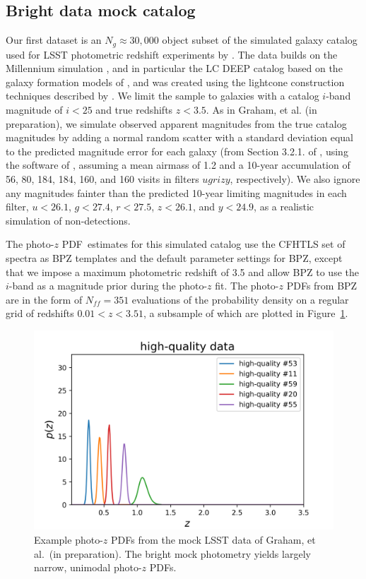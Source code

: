 \documentclass[\docopts]{\docclass}
\newcommand{\pz}{photo-$z$ PDF}
\newcommand{\mgdata}{bright\xspace}
\newcommand{\Mgdata}{Bright\xspace}
\begin{document}
\subsection{\Mgdata data mock catalog}
\label{sec:graham}

Our first dataset is an $N_{g}\approx30,000$ object subset of the simulated 
galaxy catalog used for LSST photometric redshift experiments by 
\citet{graham_photometric_2017}.
The data builds on the Millennium simulation \citep{springel_simulations_2005}, 
and in particular the LC DEEP catalog based on the galaxy formation models of 
\cite{gonzalez-perez_how_2014}, and was created using the lightcone 
construction techniques described by \cite{merson_lightcone_2013}.
We limit the sample to galaxies with a catalog $i$-band magnitude of $i<25$ and 
true redshifts $z<3.5$.
As in Graham, et al. (in preparation), we simulate observed apparent magnitudes 
from the true catalog magnitudes by adding a normal random scatter with a 
standard deviation equal to the predicted magnitude error for each galaxy (from 
Section 3.2.1. of \citealt{ivezic_lsst:_2008}, using the software of 
\citealt{connolly_end--end_2014}, assuming a mean airmass of 1.2 and a 10-year 
accumulation of 56, 80, 184, 184, 160, and 160 visits in filters $ugrizy$, 
respectively).
We also ignore any magnitudes fainter than the predicted 10-year limiting 
magnitudes in each filter, $u<26.1$, $g<27.4$, $r<27.5$, $z<26.1$, and 
$y<24.9$, as a realistic simulation of non-detections.

The \pz\ estimates for this simulated catalog use the CFHTLS set of spectra 
\citep{ilbert_accurate_2006} as BPZ templates and the default parameter 
settings for BPZ, except that we impose a maximum photometric redshift of 3.5 
and allow BPZ to use the $i$-band as a magnitude prior during the photo-$z$ fit.
The \pz s from BPZ are in the form of $N_{ff} = 351$ evaluations of the 
probability density on a regular grid of redshifts $0.01 < z < 3.51$, a 
subsample of which are plotted in Figure~\ref{fig:graham_pzs}.

\begin{figure}
  \includegraphics[width=0.9\columnwidth]{figures/graham_pzs.png}
  \caption{Example \pz s from the mock LSST data of Graham, et al.\ (in 
preparation).
  The \mgdata mock photometry yields largely narrow, unimodal \pz s.
  \label{fig:graham_pzs}}
\end{figure}
\end{document}
